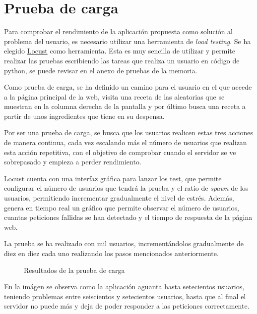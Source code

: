 \section{Prueba de carga}
Para comprobar el rendimiento de la aplicación propuesta como solución al problema del usuario, es necesario utilizar una herramienta de \emph{load testing}. Se ha elegido \href{https://locust.io/}{Locust} como herramienta. Esta es muy sencilla de utilizar y permite realizar las pruebas escribiendo las tareas que realiza un usuario en código de \Gls{python}, se puede revisar en el anexo de pruebas de la memoria.

Como prueba de carga, se ha definido un camino para el usuario en el que accede a la página principal de la web, visita una receta de las aleatorias que se muestran en la columna derecha de la pantalla y por último busca una receta a partir de unos ingredientes que tiene en su despensa.

Por ser una prueba de carga, se busca que los usuarios realicen estas tres acciones de manera continua, cada vez escalando más el número de usuarios que realizan esta acción repetitiva, con el objetivo de comprobar cuando el servidor se ve sobrepasado y empieza a perder rendimiento. 

Locust cuenta con una interfaz gráfica para lanzar los \gls{test}, que permite configurar el número de usuarios que tendrá la prueba y el ratio de \emph{spawn} de los usuarios, permitiendo incrementar gradualmente el nivel de estrés. Además, genera en tiempo real un gráfico que permite observar el número de usuarios, cuantas peticiones fallidas se han detectado y el tiempo de respuesta de la página web.

La prueba se ha realizado con mil usuarios, incrementándolos gradualmente de diez en diez cada uno realizando los pasos mencionados anteriormente. 

\begin{figure}[H]
    \caption{Resultados de la prueba de carga}
    \label{fig:Daniel-pasos2}
\end{figure}

En la imágen se observa como la aplicación aguanta hasta setecientos usuarios, teniendo problemas entre seiscientos y setecientos usuarios, hasta que al final el servidor no puede más y deja de poder responder a las peticiones correctamente.
